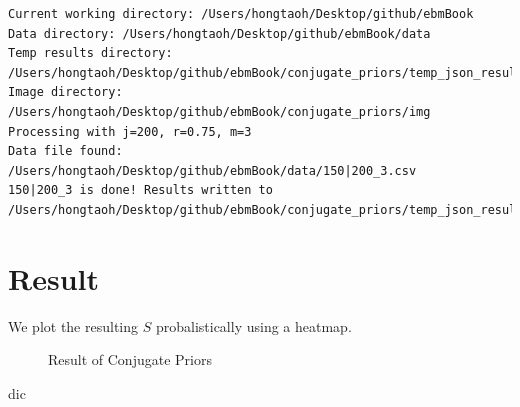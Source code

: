 \documentclass[
  letterpaper,
  DIV=11,
  numbers=noendperiod]{scrreprt}
\newenvironment{Shaded}{\begin{snugshade}}{\end{snugshade}}
\newcommand{\NormalTok}[1]{\textcolor[rgb]{0.00,0.23,0.31}{#1}}
\begin{document}
\begin{verbatim}
Current working directory: /Users/hongtaoh/Desktop/github/ebmBook
Data directory: /Users/hongtaoh/Desktop/github/ebmBook/data
Temp results directory: /Users/hongtaoh/Desktop/github/ebmBook/conjugate_priors/temp_json_results
Image directory: /Users/hongtaoh/Desktop/github/ebmBook/conjugate_priors/img
Processing with j=200, r=0.75, m=3
Data file found: /Users/hongtaoh/Desktop/github/ebmBook/data/150|200_3.csv
150|200_3 is done! Results written to /Users/hongtaoh/Desktop/github/ebmBook/conjugate_priors/temp_json_results/temp_results_200_0.75_3.json
\end{verbatim}

\section{Result}\label{result-3}

We plot the resulting \(S\) probalistically using a heatmap.

\begin{figure}


\caption{\label{fig-conjugate_priors-result}Result of Conjugate Priors}

\end{figure}%

\begin{Shaded}
\begin{Highlighting}[]
\NormalTok{dic}
\end{Highlighting}
\end{Shaded}
\end{document}
